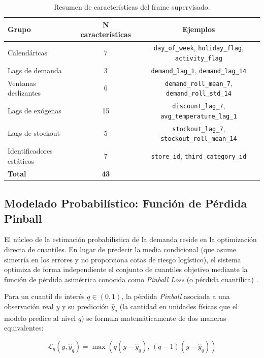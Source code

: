 \begin{table}[htbp]
    \centering
    \small
    \setlength{\tabcolsep}{4pt}
    \begin{tabular}{lcc}
        \toprule
        \textbf{Grupo} & \textbf{N\textordmasculine{} características} & \textbf{Ejemplos} \\
        \midrule
        Calendáricas & 7 & \texttt{day\_of\_week}, \texttt{holiday\_flag}, \texttt{activity\_flag} \\
        Lags de demanda & 3 & \texttt{demand\_lag\_1}, \texttt{demand\_lag\_14} \\
        Ventanas deslizantes & 6 & \texttt{demand\_roll\_mean\_7}, \texttt{demand\_roll\_std\_14} \\
        Lags de exógenas & 15 & \texttt{discount\_lag\_7}, \texttt{avg\_temperature\_lag\_1} \\
        Lags de stockout & 5 & \texttt{stockout\_lag\_7}, \texttt{stockout\_roll\_mean\_14} \\
        Identificadores estáticos & 7 & \texttt{store\_id}, \texttt{third\_category\_id} \\
        \midrule
        \textbf{Total} & \textbf{43} & \\
        \bottomrule
    \end{tabular}
    \caption{Resumen de características del frame supervisado.}
    \label{tab:features_summary}
\end{table}

\subsection{Modelado Probabilístico: Función de Pérdida Pinball}
\label{sec:pinball}
El núcleo de la estimación probabilística de la demanda reside en la optimización directa de cuantiles. En lugar de predecir la media condicional (que asume simetría en los errores y no proporciona cotas de riesgo logístico), el sistema optimiza de forma independiente el conjunto de cuantiles objetivo mediante la función de pérdida asimétrica conocida como \textit{Pinball Loss} (o pérdida cuantílica) \cite{koenker2005quantile}.

Para un cuantil de interés $q \in (0, 1)$, la pérdida \textit{Pinball} asociada a una observación real $y$ y su predicción $\hat{y}_q$ (la cantidad en unidades físicas que el modelo predice al nivel $q$) se formula matemáticamente de dos maneras equivalentes:

\begin{equation}
    \mathcal{L}_q(y, \hat{y}_q) = \max \left( q(y - \hat{y}_q), \, (q - 1)(y - \hat{y}_q) \right)
\end{equation}

